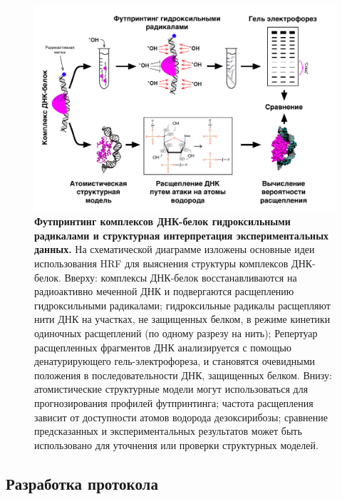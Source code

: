 \begin{figure} [H]
    \centering
    \includegraphics[width=\textwidth]{images/p5/part5_1_np/p5_1_f1.pdf}
    \caption[Футпринтинг комплексов ДНК-белок гидроксильными радикалами и структурная интерпретация экспериментальных данных.]{\textbf{Футпринтинг комплексов ДНК-белок гидроксильными радикалами и структурная интерпретация экспериментальных данных.} На схематической диаграмме изложены основные идеи использования HRF для выяснения структуры комплексов ДНК-белок. Вверху: комплексы ДНК-белок восстанавливаются на радиоактивно меченной ДНК и подвергаются расщеплению гидроксильными радикалами; гидроксильные радикалы расщепляют нити ДНК на участках, не защищенных белком, в режиме кинетики одиночных расщеплений (по одному разрезу на нить); Репертуар расщепленных фрагментов ДНК анализируется с помощью денатурирующего гель-электрофореза, и становятся очевидными положения в последовательности ДНК, защищенных белком. Внизу: атомистические структурные модели могут использоваться для прогнозирования профилей футпринтинга; частота расщепления зависит от доступности атомов водорода дезоксирибозы; сравнение предсказанных и экспериментальных результатов может быть использовано для уточнения или проверки структурных моделей.}
    \label{fig:p5_1_f1}
\end{figure}

\subsection{Разработка протокола}

